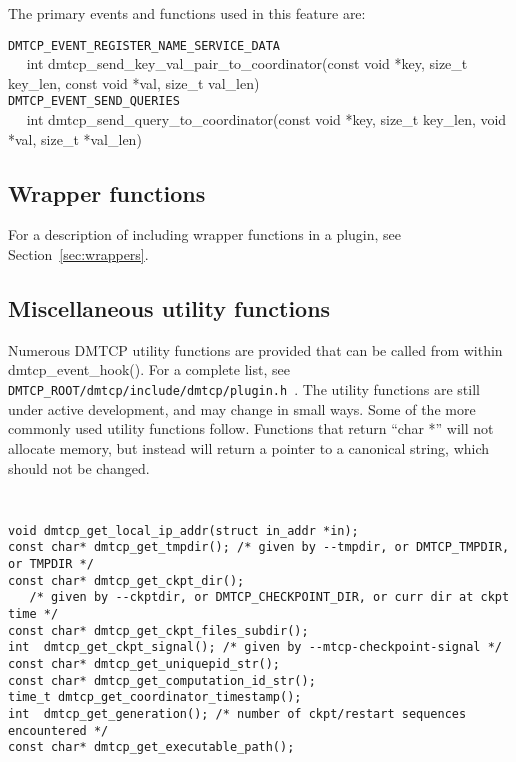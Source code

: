 \documentclass{article}
\begin{document}
The primary events and functions used in this feature are:

\noindent
{\tt DMTCP\_EVENT\_REGISTER\_NAME\_SERVICE\_DATA} \\
\hbox{\ \ }
int dmtcp\_send\_key\_val\_pair\_to\_coordinator(const void *key,
                                                   size\_t key\_len,
                                                   const void *val,
                                                   size\_t val\_len) \\
{\tt DMTCP\_EVENT\_SEND\_QUERIES} \\
\hbox{\ \ }
int dmtcp\_send\_query\_to\_coordinator(const void *key, size\_t key\_len,
                                            void *val, size\_t *val\_len)

\subsection{Wrapper functions}

For a description of including wrapper functions in a plugin, see
Section~\ref{sec:wrappers}.

\subsection{Miscellaneous utility functions}

Numerous DMTCP utility functions are provided that can be called from within
dmtcp\_event\_hook().  For a complete list, see
{\tt DMTCP\_ROOT/dmtcp/include/dmtcp/plugin.h}~.
The utility functions are still under active development, and may change
in small ways.  Some of the more commonly used utility functions follow.
Functions that return ``char *'' will not allocate memory, but instead will
return a pointer to a canonical string, which should not be changed.
{\tt
\begin{verbatim}
void dmtcp_get_local_ip_addr(struct in_addr *in);
const char* dmtcp_get_tmpdir(); /* given by --tmpdir, or DMTCP_TMPDIR, or TMPDIR */
const char* dmtcp_get_ckpt_dir();
   /* given by --ckptdir, or DMTCP_CHECKPOINT_DIR, or curr dir at ckpt time */
const char* dmtcp_get_ckpt_files_subdir();
int  dmtcp_get_ckpt_signal(); /* given by --mtcp-checkpoint-signal */
const char* dmtcp_get_uniquepid_str();
const char* dmtcp_get_computation_id_str();
time_t dmtcp_get_coordinator_timestamp();
int  dmtcp_get_generation(); /* number of ckpt/restart sequences encountered */
const char* dmtcp_get_executable_path();
\end{verbatim}
}
\end{document}
